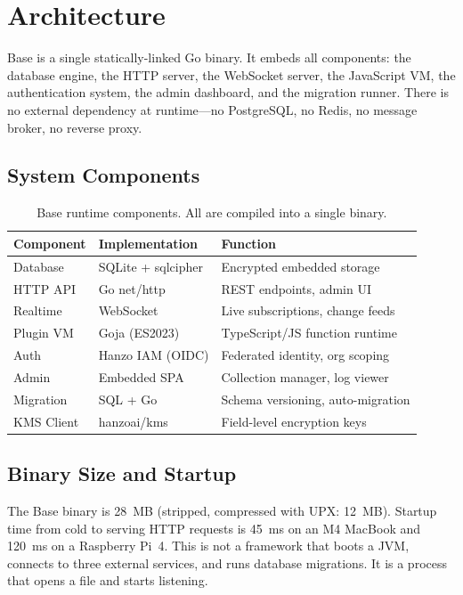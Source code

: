 \section{Architecture}

\label{sec:architecture}

Base is a single statically-linked Go binary. It embeds all components: the
database engine, the HTTP server, the WebSocket server, the JavaScript VM, the
authentication system, the admin dashboard, and the migration runner. There is
no external dependency at runtime---no PostgreSQL, no Redis, no message broker,
no reverse proxy.

\subsection{System Components}

\begin{table}[H]
\centering
\small
\begin{tabular}{llp{5.5cm}}
\toprule
\textbf{Component} & \textbf{Implementation} & \textbf{Function} \\
\midrule
Database & SQLite + sqlcipher & Encrypted embedded storage \\
HTTP API & Go net/http & REST endpoints, admin UI \\
Realtime & WebSocket & Live subscriptions, change feeds \\
Plugin VM & Goja (ES2023) & TypeScript/JS function runtime \\
Auth & Hanzo IAM (OIDC) & Federated identity, org scoping \\
Admin & Embedded SPA & Collection manager, log viewer \\
Migration & SQL + Go & Schema versioning, auto-migration \\
KMS Client & hanzoai/kms & Field-level encryption keys \\
\bottomrule
\end{tabular}
\caption{Base runtime components. All are compiled into a single binary.}
\label{tab:components}
\end{table}

\subsection{Binary Size and Startup}

The Base binary is 28~MB (stripped, compressed with UPX: 12~MB). Startup time
from cold to serving HTTP requests is 45~ms on an M4 MacBook and 120~ms on a
Raspberry Pi~4. This is not a framework that boots a JVM, connects to three
external services, and runs database migrations. It is a process that opens a
file and starts listening.

